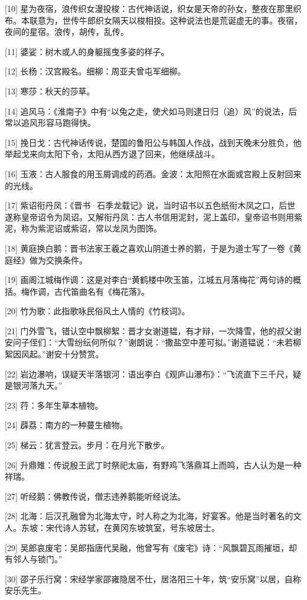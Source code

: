 \documentclass[12pt,UTF8]{ctexbook}
\begin{document}
[10] 星为夜宿，浪传织女漫投梭：古代神话说，织女是天帝的孙女，整夜在那里织布。本联意为，世传牛郎织女隔天以梭相投。这种说法也是荒诞虚无的事。夜宿，夜间的星宿。浪传，胡传，乱传。

[11] 婆娑：树木或人的身躯摇曳多姿的样子。

[12] 长杨：汉宫殿名。细柳：周亚夫曾屯军细柳。

[13] 寒莎：秋天的莎草。

[14] 追风马：《淮南子》中有“以兔之走，使犬如马则逮日归（追）风”的说法，后常以追风形容马跑得快。

[15] 挽日戈：古代神话传说，楚国的鲁阳公与韩国人作战，战到天晚未分胜负，他举起戈来向太阳下令，太阳从西方退了回来，他继续战斗。

[16] 玉液：古人服食的用玉屑调成的药酒。金波：太阳照在水面或宫殿上反射回来的光线。

[17] 紫诏衔丹凤：《晋书·石季龙载记》说，当时诏书以五色纸衔木凤之口，后世遂称皇帝诏令为凤诏。又解衔丹凤：古人书信用泥封，泥上盖印，皇帝诏书则用紫泥，称为紫泥诏或紫诏，常以龙凤为图饰。

[18] 黄庭换白鹅：晋书法家王羲之喜欢山阴道士养的鹅，于是为道士写了一卷《黄庭经》做为交换条件。

[19] 画阁江城梅作调：这是对李白“黄鹤楼中吹玉笛，江城五月落梅花”两句诗的概括。梅作调，古代笛曲名有《梅花落》。

[20] 竹为歌：此指歌咏民俗风土人情的《竹枝词》。

[21] 门外雪飞，错认空中飘柳絮：晋才女谢道韫，有才辩，一次降雪，他的叔父谢安问子侄们：“大雪纷纭何所似？”谢朗说：“撒盐空中差可拟。”谢道韫说：“未若柳絮因风起。”谢安十分赞赏。

[22] 岩边瀑响，误疑天半落银河：语出李白《观庐山瀑布》：“飞流直下三千尺，疑是银河落九天。”

[23] 荇：多年生草本植物。

[24] 薜荔：南方的一种蔓生植物。

[25] 梯云：犹言登云。步月：在月光下散步。

[26] 升鼎雉：传说殷王武丁时祭祀太庙，有野鸡飞落鼎耳上而鸣，古人认为是一种祥瑞。

[27] 听经鹅：佛教传说，僧志违养鹅能听经说法。

[28] 北海：后汉孔融曾为北海太守，时人称之为北海，好宴客。他是当时著名的文人。东坡：宋代诗人苏轼，在黄冈东坡筑室，号东坡居士。

[29] 吴郎哀废宅：吴郎指唐代吴融，他曾写有《废宅》诗：“风飘碧瓦雨摧垣，却有邻人与锁门。”

[30] 邵子乐行窝：宋经学家邵雍隐居不仕，居洛阳三十年，筑“安乐窝”以居，自称安乐先生。
\end{document}
